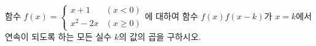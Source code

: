 함수 $f(x)=\begin{cases} x+1 & (x<0) \\ x^2-2x & (x\ge 0) \end{cases}$에 대하여 함수 $f(x)f(x-k)$가 $x=k$에서 연속이 되도록 하는 모든 실수 $k$의 값의 곱을 구하시오. 
